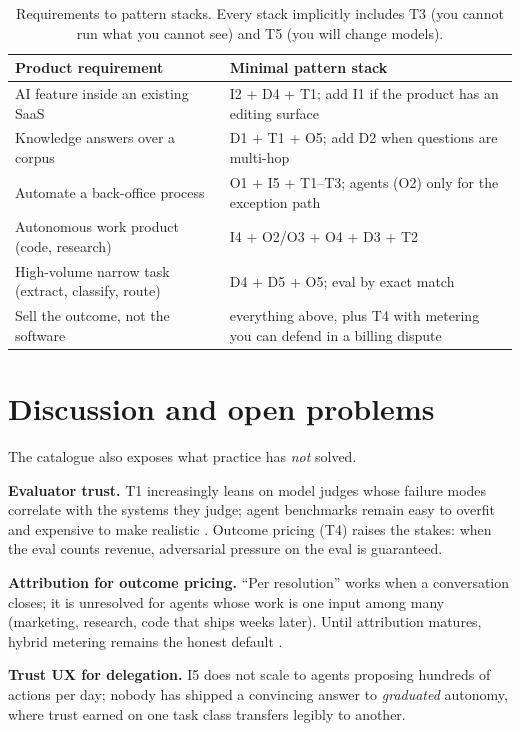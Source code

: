 \documentclass[11pt]{article}
\begin{document}
\begin{table}[tbp]
\centering
\small
\begin{tabular}{@{}L{4.6cm} L{8.9cm}@{}}
\toprule
Product requirement & Minimal pattern stack \\
\midrule
AI feature inside an existing SaaS & I2 + D4 + T1; add I1 if the product has an editing surface \\
Knowledge answers over a corpus & D1 + T1 + O5; add D2 when questions are multi-hop \\
Automate a back-office process & O1 + I5 + T1--T3; agents (O2) only for the exception path \\
Autonomous work product (code, research) & I4 + O2/O3 + O4 + D3 + T2 \\
High-volume narrow task (extract, classify, route) & D4 + D5 + O5; eval by exact match \\
Sell the outcome, not the software & everything above, plus T4 with metering you can defend in a billing dispute \\
\bottomrule
\end{tabular}
\caption{Requirements to pattern stacks. Every stack implicitly includes T3
(you cannot run what you cannot see) and T5 (you will change models).}
\label{tab:decision}
\end{table}

\section{Discussion and open problems}

The catalogue also exposes what practice has \emph{not} solved.

\textbf{Evaluator trust.} T1 increasingly leans on model judges
\citep{zheng2023judge} whose failure modes correlate with the systems they
judge; agent benchmarks remain easy to overfit and expensive to make
realistic \citep{kapoor2024agentsmatter}. Outcome pricing (T4) raises the
stakes: when the eval counts revenue, adversarial pressure on the eval is
guaranteed.

\textbf{Attribution for outcome pricing.} ``Per resolution'' works when a
conversation closes; it is unresolved for agents whose work is one input among
many (marketing, research, code that ships weeks later). Until attribution
matures, hybrid metering remains the honest default \citep{bvp2026pricing}.

\textbf{Trust UX for delegation.} I5 does not scale to agents proposing
hundreds of actions per day; nobody has shipped a convincing answer to
\emph{graduated} autonomy, where trust earned on one task class transfers
legibly to another.
\end{document}
